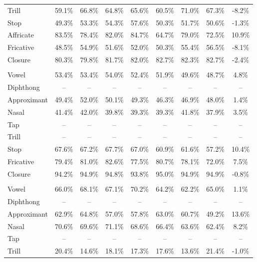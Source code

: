 \begin{table}
\begin{tabular}{l|ccccccc|c}
Trill & 59.1\% & 66.8\% & 64.8\% & 65.6\% & 60.5\% & 71.0\% & 67.3\% & -8.2\% \\
Stop & 49.3\% & 53.3\% & 54.3\% & 57.6\% & 50.3\% & 51.7\% & 50.6\% & -1.3\% \\
Affricate & 83.5\% & 78.4\% & 82.0\% & 84.7\% & 64.7\% & 79.0\% & 72.5\% & 10.9\% \\
Fricative & 48.5\% & 54.9\% & 51.6\% & 52.0\% & 50.3\% & 55.4\% & 56.5\% & -8.1\% \\
Closure & 80.3\% & 79.8\% & 81.7\% & 82.0\% & 82.7\% & 82.3\% & 82.7\% & -2.4\% \\
\addlinespace
\multicolumn{9}{l}{\textbf{French}} \\
Vowel & 53.4\% & 53.4\% & 54.0\% & 52.4\% & 51.9\% & 49.6\% & 48.7\% & 4.8\% \\
Diphthong & -- & -- & -- & -- & -- & -- & -- & -- \\
Approximant & 49.4\% & 52.0\% & 50.1\% & 49.3\% & 46.3\% & 46.9\% & 48.0\% & 1.4\% \\
Nasal & 41.4\% & 42.0\% & 39.8\% & 39.3\% & 39.3\% & 41.8\% & 37.9\% & 3.5\% \\
Tap & -- & -- & -- & -- & -- & -- & -- & -- \\
Trill & -- & -- & -- & -- & -- & -- & -- & -- \\
Stop & 67.6\% & 67.2\% & 67.7\% & 67.0\% & 60.9\% & 61.6\% & 57.2\% & 10.4\% \\
Fricative & 79.4\% & 81.0\% & 82.6\% & 77.5\% & 80.7\% & 78.1\% & 72.0\% & 7.5\% \\
Closure & 94.2\% & 94.9\% & 94.8\% & 93.8\% & 95.0\% & 94.9\% & 94.9\% & -0.8\% \\
\addlinespace
\multicolumn{9}{l}{\textbf{Polish}} \\
Vowel & 66.0\% & 68.1\% & 67.1\% & 70.2\% & 64.2\% & 62.2\% & 65.0\% & 1.1\% \\
Diphthong & -- & -- & -- & -- & -- & -- & -- & -- \\
Approximant & 62.9\% & 64.8\% & 57.0\% & 57.8\% & 63.0\% & 60.7\% & 49.2\% & 13.6\% \\
Nasal & 70.6\% & 69.6\% & 71.1\% & 68.6\% & 66.4\% & 63.6\% & 62.4\% & 8.2\% \\
Tap & -- & -- & -- & -- & -- & -- & -- & -- \\
Trill & 20.4\% & 14.6\% & 18.1\% & 17.3\% & 17.6\% & 13.6\% & 21.4\% & -1.0\% \\

\end{tabular}
\end{table}
